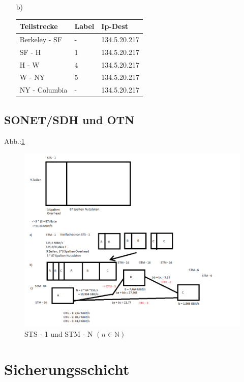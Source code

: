 \begin{itemize}
	\item[b)] 
	\begin{tabularx}{\textwidth}{|X|X|X|}
	\hline
	Teilstrecke	&Label	&Ip-Dest \\
	\hline
	Berkeley - SF	&-	&134.5.20.217 \\
	\hline
	SF - H		&1	&134.5.20.217 \\
	\hline
	H - W		&4	&134.5.20.217\\
	\hline
	W - NY		&5	&134.5.20.217 \\
	\hline
	NY - Columbia	&-	&134.5.20.217 \\
	\hline
\end{tabularx}
\end{itemize}
\subsection{SONET/SDH und OTN}
Abb.:\ref{img:SONET}
\begin{figure}
		\centering
		\includegraphics[width = 16cm]{./Rechnernetze/Images/4_5abc.png}
		\caption{STS - 1 und STM - N \((n \in \mathbb N)\)}
		\label{img:SONET}
\end{figure}
\section{Sicherungsschicht}
